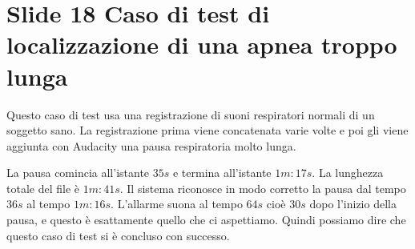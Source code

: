 \section{Slide 18 Caso di test di localizzazione di una apnea troppo lunga}
Questo caso di test usa una registrazione di suoni respiratori normali di un soggetto sano. La registrazione prima viene concatenata varie volte e poi gli viene aggiunta con Audacity una pausa respiratoria molto lunga.

La pausa comincia all'istante $35s$ e termina all'istante $1m:17s$. 
La lunghezza totale del file \`e $1m:41s$.
Il sistema riconosce in modo corretto la pausa dal tempo $36s$ al tempo $1m:16s$.
L'allarme suona al tempo $64s$ cio\`e $30s$ dopo l'inizio della pausa, e questo \`e esattamente quello che ci aspettiamo.
Quindi possiamo dire che questo caso di test si \`e concluso con successo.
